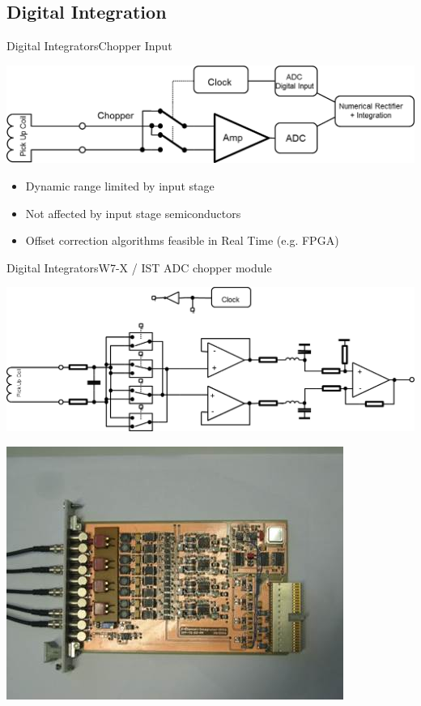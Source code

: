 \documentclass{beamer}
\begin{document}
\subsection{Digital Integration}
\begin{frame}{Digital Integrators}{Chopper Input}
	\begin{center}
		\includegraphics[width=0.8\columnwidth]{chopperInt.png}
	\end{center}
	\begin{itemize}
		\item Dynamic range limited by input stage
		\item Not affected by input stage semiconductors
		\item Offset correction algorithms feasible in Real Time (e.g. FPGA)
 	\end{itemize}
%
%
\end{frame}

\begin{frame}{Digital Integrators}{W7-X / IST ADC chopper module}
	\begin{center}
		\includegraphics[width=0.7\columnwidth]{w7xSchema.png}

		\includegraphics[height = 3 cm]{w7xInt.jpg}
	\end{center}
\end{frame}
\end{document}
